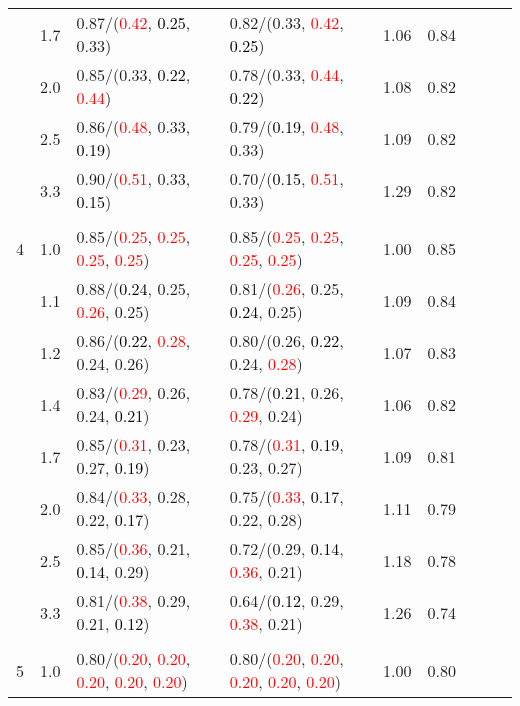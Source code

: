 \documentclass[10pt,a4paper]{report}
\begin{document}
\begin{table}[!htbp]
\begin{center}
{\begin{tabular}{ccllccccc}
			&1.7&0.87/(\textcolor{red}{0.42}, \textcolor{black}{0.25}, 0.33)&0.82/(0.33, \textcolor{red}{0.42}, \textcolor{black}{0.25})&1.06&0.84\\
			&2.0&0.85/(0.33, \textcolor{black}{0.22}, \textcolor{red}{0.44})&0.78/(0.33, \textcolor{red}{0.44}, \textcolor{black}{0.22})&1.08&0.82\\
			&2.5&0.86/(\textcolor{red}{0.48}, 0.33, \textcolor{black}{0.19})&0.79/(\textcolor{black}{0.19}, \textcolor{red}{0.48}, 0.33)&1.09&0.82\\
			&3.3&0.90/(\textcolor{red}{0.51}, 0.33, \textcolor{black}{0.15})&0.70/(\textcolor{black}{0.15}, \textcolor{red}{0.51}, 0.33)&1.29&0.82\\
			&&&&\\
			4			&1.0&0.85/(\textcolor{red}{0.25}, \textcolor{red}{0.25}, \textcolor{red}{0.25}, \textcolor{red}{0.25})&0.85/(\textcolor{red}{0.25}, \textcolor{red}{0.25}, \textcolor{red}{0.25}, \textcolor{red}{0.25})&1.00&0.85\\
			&1.1&0.88/(\textcolor{black}{0.24}, 0.25, \textcolor{red}{0.26}, 0.25)&0.81/(\textcolor{red}{0.26}, 0.25, \textcolor{black}{0.24}, 0.25)&1.09&0.84\\
			&1.2&0.86/(\textcolor{black}{0.22}, \textcolor{red}{0.28}, 0.24, 0.26)&0.80/(0.26, \textcolor{black}{0.22}, 0.24, \textcolor{red}{0.28})&1.07&0.83\\
			&1.4&0.83/(\textcolor{red}{0.29}, 0.26, 0.24, \textcolor{black}{0.21})&0.78/(\textcolor{black}{0.21}, 0.26, \textcolor{red}{0.29}, 0.24)&1.06&0.82\\
			&1.7&0.85/(\textcolor{red}{0.31}, 0.23, 0.27, \textcolor{black}{0.19})&0.78/(\textcolor{red}{0.31}, \textcolor{black}{0.19}, 0.23, 0.27)&1.09&0.81\\
			&2.0&0.84/(\textcolor{red}{0.33}, 0.28, 0.22, \textcolor{black}{0.17})&0.75/(\textcolor{red}{0.33}, \textcolor{black}{0.17}, 0.22, 0.28)&1.11&0.79\\
			&2.5&0.85/(\textcolor{red}{0.36}, 0.21, \textcolor{black}{0.14}, 0.29)&0.72/(0.29, \textcolor{black}{0.14}, \textcolor{red}{0.36}, 0.21)&1.18&0.78\\
			&3.3&0.81/(\textcolor{red}{0.38}, 0.29, 0.21, \textcolor{black}{0.12})&0.64/(\textcolor{black}{0.12}, 0.29, \textcolor{red}{0.38}, 0.21)&1.26&0.74\\
			&&&&\\
			5			&1.0&0.80/(\textcolor{red}{0.20}, \textcolor{red}{0.20}, \textcolor{red}{0.20}, \textcolor{red}{0.20}, \textcolor{red}{0.20})&0.80/(\textcolor{red}{0.20}, \textcolor{red}{0.20}, \textcolor{red}{0.20}, \textcolor{red}{0.20}, \textcolor{red}{0.20})&1.00&0.80\\

\end{tabular}}
\end{center}
\end{table}
\end{document}
